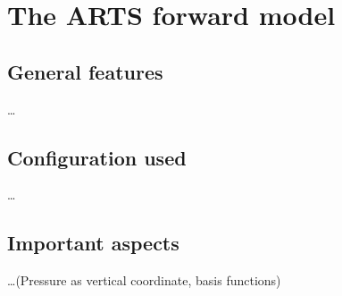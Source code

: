 \chapter{The ARTS forward model}
\label{chapter:arts}


\section{General features}
\label{sec:arts:features}
%
\dots


\section{Configuration used}
\label{sec:arts:config}
%
\dots


\section{Important aspects}
\label{sec:arts:aspects}
%
\dots (Pressure as vertical coordinate, basis functions)





